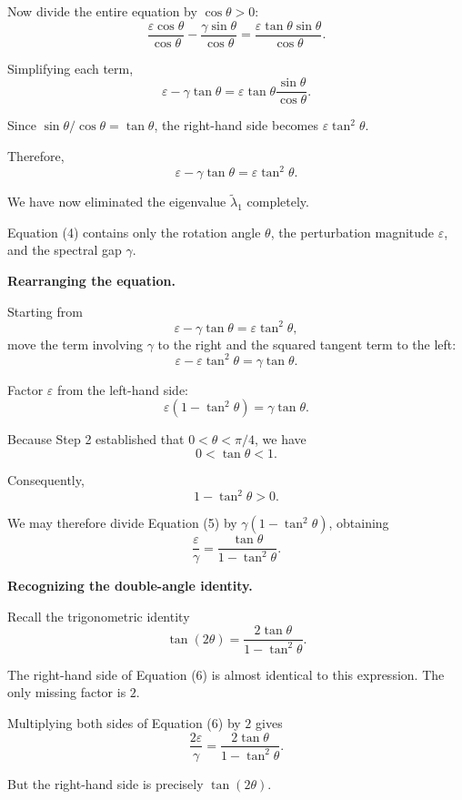 \documentclass[14pt,letterpaper]{article}
\theoremstyle{plain}
\theoremstyle{definition}
\theoremstyle{remark}
\begin{document}
Now divide the entire equation by
$\cos\theta>0$:
\[
\frac{\varepsilon\cos\theta}{\cos\theta}
-
\frac{\gamma\sin\theta}{\cos\theta}
=
\frac{\varepsilon\tan\theta\sin\theta}
{\cos\theta}.
\]

Simplifying each term,
\[
\varepsilon-\gamma\tan\theta
=
\varepsilon\tan\theta
\frac{\sin\theta}{\cos\theta}.
\]

Since $\sin\theta/\cos\theta=\tan\theta$,
the right-hand side becomes
$\varepsilon\tan^2\theta$.

Therefore,
\[
\boxed{
\varepsilon-\gamma\tan\theta
=
\varepsilon\tan^2\theta.
}
\tag{4}
\]

We have now eliminated the eigenvalue
$\widetilde\lambda_1$ completely.

Equation (4) contains only the rotation angle
$\theta$, the perturbation magnitude $\varepsilon$,
and the spectral gap $\gamma$.

\medskip

\noindent\textbf{Rearranging the equation.}

Starting from
\[
\varepsilon-\gamma\tan\theta
=
\varepsilon\tan^2\theta,
\]
move the term involving $\gamma$ to the right
and the squared tangent term to the left:
\[
\varepsilon-\varepsilon\tan^2\theta
=
\gamma\tan\theta.
\]

Factor $\varepsilon$ from the left-hand side:
\[
\boxed{
\varepsilon(1-\tan^2\theta)
=
\gamma\tan\theta.
}
\tag{5}
\]

Because Step 2 established that
$0<\theta<\pi/4$, we have
\[
0<\tan\theta<1.
\]

Consequently,
\[
1-\tan^2\theta>0.
\]

We may therefore divide Equation (5) by
$\gamma(1-\tan^2\theta)$, obtaining
\[
\boxed{
\frac{\varepsilon}{\gamma}
=
\frac{\tan\theta}{1-\tan^2\theta}.
}
\tag{6}
\]

\medskip

\noindent\textbf{Recognizing the double-angle identity.}

Recall the trigonometric identity
\[
\boxed{
\tan(2\theta)
=
\frac{2\tan\theta}{1-\tan^2\theta}.
}
\]

The right-hand side of Equation (6) is
almost identical to this expression.
The only missing factor is $2$.

Multiplying both sides of Equation (6) by $2$
gives
\[
\frac{2\varepsilon}{\gamma}
=
\frac{2\tan\theta}{1-\tan^2\theta}.
\]

But the right-hand side is precisely
$\tan(2\theta)$.
\end{document}
